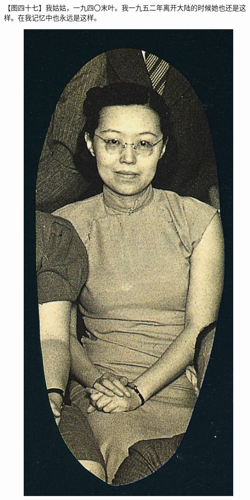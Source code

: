 \clearpage
\par 【图四十七】我姑姑，一九四〇末叶。我一九五二年离开大陆的时候她也还是这样。在我记忆中也永远是这样。
\begin{figure}[htb]
    \centering %
    \includegraphics[scale=0.4]{picture/对照记47.jpeg}
\end{figure}



